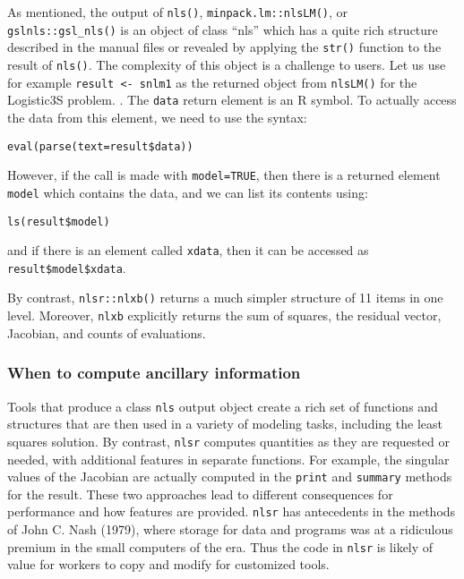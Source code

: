 As mentioned, the output of \texttt{nls()}, \texttt{minpack.lm::nlsLM()}, or
\texttt{gslnls::gsl\_nls()} is an object of class ``nls'' which has a quite rich structure
described in the manual files or revealed by applying the \texttt{str()} function to the
result of \texttt{nls()}. The complexity of this object is a challenge to users. Let us
use for example \texttt{result\ \textless{}-\ snlm1} as the returned object from \texttt{nlsLM()} for the
Logistic3S problem. . The \texttt{data} return element
is an R symbol. To actually access the data from this element, we need to use
the syntax:

\begin{verbatim}
eval(parse(text=result$data))
\end{verbatim}

However, if the call is made with \texttt{model=TRUE}, then there is a returned element
\texttt{model} which contains the data, and we can list its contents using:

\begin{verbatim}
ls(result$model)
\end{verbatim}

and if there is an element called \texttt{xdata}, then it can be accessed as
\texttt{result\$model\$xdata}.

By contrast, \texttt{nlsr::nlxb()} returns a much simpler structure of 11 items
in one level. Moreover, \texttt{nlxb} explicitly returns the sum of squares, the residual vector, Jacobian, and counts of evaluations.

\hypertarget{when-to-compute-ancillary-information}{%
\subsubsection{When to compute ancillary information}\label{when-to-compute-ancillary-information}}

Tools that produce a class \texttt{nls} output object create a rich set of functions
and structures that are then used in a variety of modeling tasks, including the
least squares solution. By contrast,
\texttt{nlsr} computes quantities as they are requested or needed, with additional
features in separate functions. For example, the singular values of the Jacobian
are actually computed in the \texttt{print} and \texttt{summary} methods for the result.
These two approaches
lead to different consequences for performance and how features are
provided. \texttt{nlsr} has antecedents in the methods of John C. Nash (1979), where storage for
data and programs was at a ridiculous premium in the small computers of the era.
Thus the code in \texttt{nlsr} is likely of value for workers to copy and modify
for customized tools.

